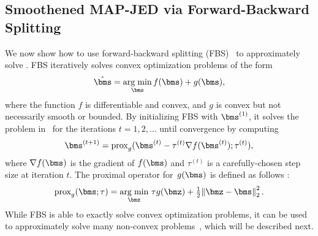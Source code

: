 \subsection{Smoothened MAP-JED via Forward-Backward Splitting}
%
We now show how to use forward-backward splitting (FBS)~\cite{goldsteinField2016} to approximately solve .  
%
FBS iteratively solves convex optimization problems of the form  
\begin{align} \label{eq:fbsproblem}
\hat\bms = \argmin_{\bms} f(\bms)+g(\bms),
\end{align}
where the function $f$ is differentiable and convex, and $ g $ is convex but not necessarily smooth or bounded.
%
By initializing FBS with $\bms^{(1)}$,  it solves the problem in~ for the iterations $ t=1,2,\ldots $ until convergence by computing  
%
\begin{align}\label{eq:fbs alg}
\bms^{(t+1)} = \text{prox}_g(\bms^{ (t) }- \tau^{(t)} \nabla f( \bms^{ (t) } );\tau^{(t)} ),
\end{align}
where $ \nabla f(\bms) $ is the gradient of $ f(\bms) $ and $ \tau^{(t)}$ is a carefully-chosen step size at iteration $t$.
%
The proximal operator for~$ g(\bms) $ is defined as follows \cite{parikh2014proximal}:
\begin{align}\label{eq:proximal def}
\text{prox}_g(\bms;\tau) = \argmin_\bmz \, \tau g(\bmz) + \textstyle \frac{1}{2}\normtwo{\bmz-\bms}^2.
\end{align}
%
While FBS is able to exactly solve convex optimization problems, it can be used to approximately solve many non-convex problems~\cite{goldsteinField2016}, which will be described next. 



